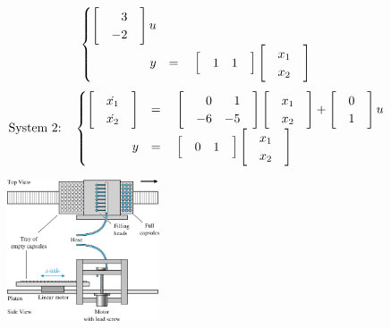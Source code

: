 \documentclass[11pt]{article}
\begin{document}
\begin{enumerate}
\begin{align*}
\begin{cases}
\begin{bmatrix*}[r]
                &3&\\
                &-2&
            \end{bmatrix*}u
            \\
            \hfill y&=\quad
            \begin{bmatrix*}[r]
                &1&1&
            \end{bmatrix*}
            \begin{bmatrix*}[r]
                &x_1&\\
                &x_2&
            \end{bmatrix*}\\
        \end{cases}
    \end{align*}
    \begin{align*}
        \text{System 2:}\quad
        \begin{cases}
            \begin{bmatrix*}[r]
                &\dot{x_1}&\\
                &\dot{x_2}&
            \end{bmatrix*}
            &=\quad
            \begin{bmatrix*}[r]
                &0 & 1&\\
                &-6 & -5&
            \end{bmatrix*}
            \begin{bmatrix*}[r]
                &x_1&\\
                &x_2&
            \end{bmatrix*}+
            \begin{bmatrix*}[r]
                &0&\\
                &1&
            \end{bmatrix*}u
            \\
            \hfill y&=\quad
            \begin{bmatrix*}[r]
                &0&1&
            \end{bmatrix*}
            \begin{bmatrix*}[r]
                &x_1&\\
                &x_2&
            \end{bmatrix*}\\
        \end{cases}
    \end{align*}
    \begin{figure}[h!]
        \centering
        \includegraphics[width=0.4\textwidth]{PS2-Q3.png}

\end{figure}
\end{enumerate}
\end{document}
